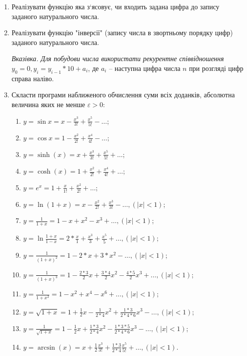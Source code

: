 \documentclass[a5paper,titlepage,openany,twoside,draft]{book_unv}%
\makeatletter
\newcommand{\xslalph}[1]{\expandafter\@xslalph\csname c@#1\endcsname}
\newcommand{\@xslalph}[1]{%
    \ifcase#1\or а\or б\or в\or г\or д\or e\or є\or ж\or з\or i%
    \or й\or к\or л\or м\or н\or о\or п\or р\or с\or т%
    \or у\or ф\or х\or ц\or ч\or ш\or ю\or я\or аа\or бб\or вв%
    \else\@ctrerr\fi%
}
\makeatother
\begin{document}
\begin{enumerate}
\begin{enumerate}[label=\xslalph*)]
\end{enumerate}

\item
  Реалізувати функцію яка з`ясовує, чи входить задана цифра до запису
  заданого натурального числа.
\item
  Реалізувати функцію "інверсії" (запису числа в звортньому порядку цифр)
  заданого натурального числа.

\emph{\emph{Вказівка. Для побудови числа використати рекурентне
співвідношення}} \(y_{0} = 0,y_{i} = y_{i - 1}*10 + a_{i}\), де
\(a_{i}\) -- наступна цифра числа \(n\) при розгляді цифр
справа наліво.

\item
  Скласти програми наближеного обчислення суми всіх доданків, абсолютна
  величина яких не менше $\varepsilon > 0 $:
\begin{enumerate}[label=\xslalph*)]
\item \(y = \sin x = x - \frac{x^{3}}{3!} + \frac{x^{5}}{5!} - \ldots\);
\item \(y = \cos x = 1 - \frac{x^{2}}{2!} + \frac{x^{4}}{4!} - \ldots\);
\item
\(y = \sinh (x) = x + \frac{x^{3}}{3!} + \frac{x^{5}}{5!} + \ldots\);
\item 
\(y = \cosh (x) = 1 + \frac{x^{2}}{2!} + \frac{x^{4}}{4!} + \ldots\);
\item \(y = e^{x} = 1 + \frac{x}{1!} + \frac{x^{2}}{2!} + \ldots\);
\item
\(y = \ln(1 + x) = x - \frac{x^{2}}{2!} + \frac{x^{3}}{3!} - \ldots,(\left| x \right| < 1)\);
\item
\(y = \frac{1}{1 + x} = 1 - x + x^{2} - x^{3} + \ldots,(\left| x \right| < 1)\);
\item
\(y = \ln\frac{1 + x}{1 - x} = 2*\frac{x}{1} + \frac{x^{3}}{3} + \frac{x^{5}}{5} + \ldots, (\left| x \right| < 1)\);
\item
\(y = \frac{1}{(1 + x)^{2}} = 1 - 2*x + 3*x^{2} - \ldots,(\left| x \right| < 1)\);
\item
\(y = \frac{1}{(1 + x)^{3}} = 1 - \frac{2*3}{2}x + \frac{3*4}{2}x^{2} - \frac{4*5}{2}x^{3} + \ldots,(\left| x \right| < 1)\);
\item
\(y = \frac{1}{1 + x^{2}} = 1 - x^{2} + x^{4} - x^{6} + \ldots,(\left| x \right| < 1)\);
\item
\(y = \sqrt{1 + x} = 1 + \frac{1}{2}x - \frac{1}{2*4}x^{2} + \frac{1*3}{2*4*6}x^{3} - \ldots,(\left| x \right| < 1)\);
\item
\(y = \frac{1}{\sqrt{1 + x}} = 1 - \frac{1}{2}x + \frac{1*3}{2*4}x^{2} - \frac{1*3*5}{2*4*6}x^{3} - \ldots,(\left| x \right| < 1)\);
\item
\(y = \arcsin (x) = x + \frac{1}{2}\frac{x^{3}}{3!} + \frac{1*3}{2*4}\frac{x^{5}}{5!} + \ldots,(\left| x \right| < 1)\).


\end{enumerate}
\end{enumerate}
\end{document}
